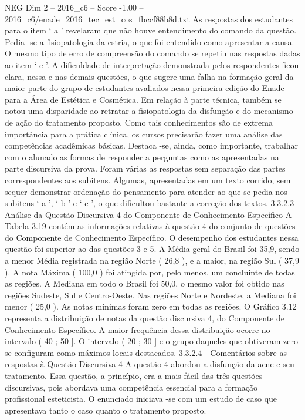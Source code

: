 \begin{textsample}{NEG Dim 2 – 2016\_c6 – Score -1.00 – 2016\_c6/enade\_2016\_tec\_est\_cos\_fbccf88b8d.txt}
As respostas dos estudantes para o item ‘ a ’ revelaram que não houve entendimento do comando da questão.
Pedia -se a fisiopatologia da estria, o que foi entendido como apresentar a causa.
O mesmo tipo de erro de compreensão do comando se repetiu nas respostas dadas ao item ‘ c ’.
A dificuldade de interpretação demonstrada pelos respondentes ficou clara, nessa e nas demais questões, o que sugere uma falha na formação geral da maior parte do grupo de estudantes avaliados nessa primeira edição do Enade para a Área de Estética e Cosmética.
Em relação à parte técnica, também se notou uma disparidade ao retratar a fisiopatologia da disfunção e do mecanismo de ação do tratamento proposto.
Como tais conhecimentos são de extrema importância para a prática clínica, os cursos precisarão fazer uma análise das competências acadêmicas básicas.
Destaca -se, ainda, como importante, trabalhar com o alunado as formas de responder a perguntas como as apresentadas na parte discursiva da prova.
Foram várias as respostas sem separação das partes correspondentes aos subitens.
Algumas, apresentadas em um texto corrido, sem sequer demonstrar ordenação do pensamento para atender ao que se pedia nos subitens ‘ a ’, ‘ b ’ e ‘ c ’, o que dificultou bastante a correção dos textos. 3.3.2.3 - Análise da Questão Discursiva 4 do Componente de Conhecimento Específico A Tabela 3.19 contém as informações relativas à questão 4 do conjunto de questões do Componente de Conhecimento Específico.
O desempenho dos estudantes nessa questão foi superior ao das questões 3 e 5.
A Média geral do Brasil foi 35,9, sendo a menor Média registrada na região Norte ( 26,8 ), e a maior, na região Sul ( 37,9 ).
A nota Máxima ( 100,0 ) foi atingida por, pelo menos, um concluinte de todas as regiões.
A Mediana em todo o Brasil foi 50,0, o mesmo valor foi obtido nas regiões Sudeste, Sul e Centro-Oeste.
Nas regiões Norte e Nordeste, a Mediana foi menor ( 25,0 ).
As notas mínimas foram zero em todas as regiões.
O Gráfico 3.12 representa a distribuição de notas da questão discursiva 4, do Componente de Conhecimento Específico.
A maior frequência dessa distribuição ocorre no intervalo ( 40 ; 50 ].
O intervalo ( 20 ; 30 ] e o grupo daqueles que obtiveram zero se configuram como máximos locais destacados. 3.3.2.4 - Comentários sobre as respostas à Questão Discursiva 4 A questão 4 abordou a disfunção da acne e seu tratamento.
Essa questão, a princípio, era a mais fácil das três questões discursivas, pois abordava uma competência essencial para a formação profissional esteticista.
O enunciado iniciava -se com um estudo de caso que apresentava tanto o caso quanto o tratamento proposto.

\end{textsample}
